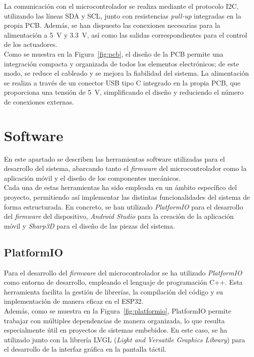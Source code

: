 La comunicación con el microcontrolador se realiza mediante el protocolo I2C, utilizando las líneas SDA y SCL, junto con resistencias \textit{pull-up} integradas en la propia PCB. Además, se han dispuesto las conexiones necesarias para la alimentación a \SI{5}{\volt} y \SI{3.3}{\volt}, así como las salidas correspondientes para el control de los actuadores.\\

Como se muestra en la Figura~\ref{fig:pcb}, el diseño de la PCB permite una integración compacta y organizada de todos los elementos electrónicos; de este modo, se reduce el cableado y se mejora la fiabilidad del sistema. La alimentación se realiza a través de un conector USB tipo C integrado en la propia PCB, que proporciona una tensión de \SI{5}{\volt}, simplificando el diseño y reduciendo el número de conexiones externas.


\section{Software}
En este apartado se describen las herramientas software utilizadas para el desarrollo del sistema, abarcando tanto el \textit{firmware} del microcontrolador como la aplicación móvil y el diseño de los componentes mecánicos.\\

Cada una de estas herramientas ha sido empleada en un ámbito específico del proyecto, permitiendo así implementar las distintas funcionalidades del sistema de forma estructurada. En concreto, se han utilizado \textit{PlatformIO} para el desarrollo del \textit{firmware} del dispositivo, \textit{Android Studio} para la creación de la aplicación móvil y \textit{Sharp3D} para el diseño de las piezas del sistema.

\subsection{PlatformIO}

Para el desarrollo del \textit{firmware} del microcontrolador se ha utilizado \textit{PlatformIO} como entorno de desarrollo, empleando el lenguaje de programación C++. Esta herramienta facilita la gestión de librerías, la compilación del código y su implementación de manera eficaz en el ESP32.\\

Además, como se muestra en la Figura~\ref{fig:platformio}, PlatformIO permite trabajar con múltiples dependencias de manera organizada, lo que resulta especialmente útil en proyectos de sistemas embebidos. En este caso, se ha utilizado junto con la librería LVGL (\textit{Light and Versatile Graphics Library}) para el desarrollo de la interfaz gráfica en la pantalla táctil.\\

